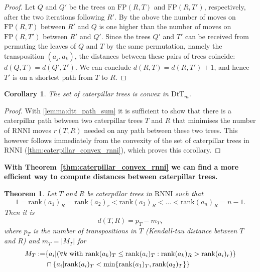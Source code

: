 \documentclass[11pt]{amsart}
\newtheorem{theorem}{Theorem}
\newtheorem{corollary}{Corollary}
\newcommand{\rnni}{\mathrm{RNNI}}
\newcommand{\rank}{\mathrm{rank}}
\newcommand{\fp}{\mathrm{FP}}
\newcommand{\dtt}{\mathrm{DtT}}
\newcommand{\summary}[1]{\textbf{#1}} %
\begin{document}
\begin{proof}
	Let $Q$ and $Q'$ be the trees on $\fp(R,T)$ and $\fp(R,T')$, respectively, after the two iterations following $R'$.
	By the above the number of moves on $\fp(R,T)$ between $R'$ and $Q$ is one higher than the number of moves on $\fp(R,T')$ between $R'$ and $Q'$.
	Since the trees $Q'$ and $T'$ can be received from permuting the leaves of $Q$ and $T$ by the same permutation, namely the transposition $(a_j, a_k)$, the distances between these pairs of trees coincide: $d(Q,T) = d(Q',T')$.
	We can conclude $d(R,T) = d(R,T') + 1$, and hence $T'$ is on a shortest path from $T$ to $R$.
\end{proof}

\begin{corollary}
	The set of caterpillar trees is convex in $\dtt_m$.
\end{corollary}

\begin{proof}
	With \autoref{lemma:dtt_path_sum} it is sufficient to show that there is a caterpillar path between two caterpillar trees $T$ and $R$ that minimises the number of $\rnni$ moves $r(T,R)$ needed on any path between these two trees.
	This however follows immediately from the convexity of the set of caterpillar trees in $\rnni$ (\autoref{thm:caterpillar_convex_rnni}), which proves this corollary.
\end{proof}

\summary{With Theorem~\ref{thm:caterpillar_convex_rnni} we can find a more efficient way to compute distances between caterpillar trees.}

\begin{theorem}
	Let $T$ and $R$ be caterpillar trees in $\rnni$ such that \[1 = \rank(a_1)_R = \rank(a_2)_r < \rank(a_3)_R < \ldots < \rank(a_n)_R = n-1.\]
	Then it is
	\[d(T,R) = p_T - m_T,\]
	where $p_T$ is the number of transpositions in $T$ (Kendall-tau distance between $T$ and $R$) and $m_T = |M_T|$ for
	\begin{align*}
		M_T := &\{a_i| (\forall k \textnormal{ with } \rank(a_k)_T \leq \rank(a_i)_T: \rank(a_k)_R > \rank(a_i)_r)\} \\
		& \cap \{a_i | \rank(a_i)_T < \min\{\rank(a_1)_T, \rank(a_2)_T\}\}
	\end{align*}
	\label{thm:caterpillar_distance_formula}
\end{theorem}
\end{document}
